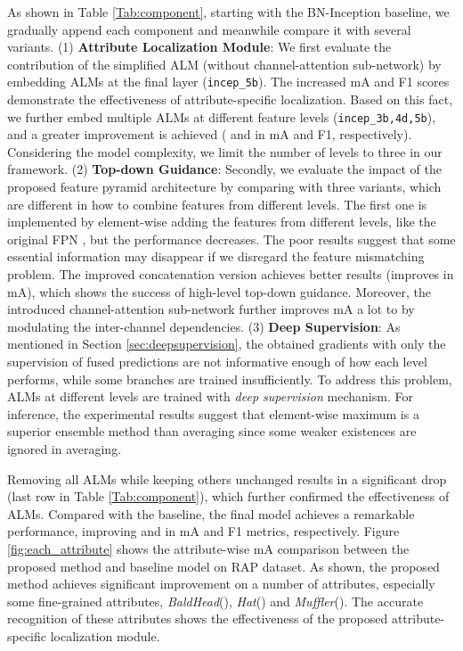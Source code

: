 \documentclass[10pt,twocolumn,letterpaper]{article}
\begin{document}
As shown in Table \ref{Tab:component}, starting with the BN-Inception baseline, we gradually append each component and meanwhile compare it with several variants.
(1) \textbf{Attribute Localization Module}: We first evaluate the contribution of the simplified ALM (without channel-attention sub-network) by embedding ALMs at the final layer (\verb'incep_5b').
The increased mA and F1 scores demonstrate the effectiveness of attribute-specific localization.
Based on this fact, we further embed multiple ALMs at different feature levels (\verb'incep_3b,4d,5b'), and a greater improvement is achieved ( and  in mA and F1, respectively).
Considering the model complexity, we limit the number of levels to three in our framework.
(2) \textbf{Top-down Guidance}: Secondly, we evaluate the impact of the proposed feature pyramid architecture by comparing with three variants, which are different in how to combine features from different levels.
The first one is implemented by element-wise adding the features from different levels, like the original FPN \cite{fpn}, but the performance decreases.
The poor results suggest that some essential information may disappear if we disregard the feature mismatching problem.
The improved concatenation version achieves better results (improves  in mA), which shows the success of high-level top-down guidance.
Moreover, the introduced channel-attention sub-network further improves mA a lot to  by modulating the inter-channel dependencies.
(3) \textbf{Deep Supervision}: As mentioned in Section \ref{sec:deepsupervision}, the obtained gradients with only the supervision of fused predictions are not informative enough of how each level performs, while some branches are trained insufficiently.
To address this problem, ALMs at different levels are trained with \textit{deep supervision} mechanism.
For inference, the experimental results suggest that element-wise maximum is a superior ensemble method than averaging since some weaker existences are ignored in averaging.

Removing all ALMs while keeping others unchanged results in a significant drop (last row in Table \ref{Tab:component}), which further confirmed the effectiveness of ALMs.
Compared with the baseline, the final model achieves a remarkable performance, improving  and  in mA and F1 metrics, respectively.
Figure \ref{fig:each_attribute} shows the attribute-wise mA comparison between the proposed method and baseline model on RAP dataset.
As shown, the proposed method achieves significant improvement on a number of attributes, especially some fine-grained attributes, \eg \textit{BaldHead}(), \textit{Hat}() and \textit{Muffler}().
The accurate recognition of these attributes shows the effectiveness of the proposed attribute-specific localization module.
\end{document}
